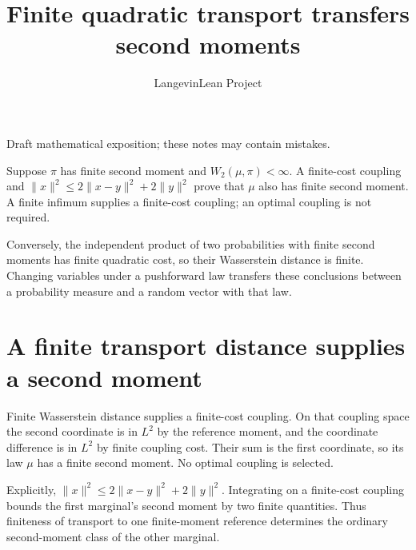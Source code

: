 \documentclass[11pt,a4paper]{article}
\title{\texorpdfstring{Finite quadratic transport transfers second moments}{Finite quadratic transport transfers second moments}}
\author{LangevinLean Project}
\date{}
\begin{document}
\maketitle
Draft mathematical exposition; these notes may contain mistakes.


Suppose \(\pi\) has finite second moment and \(W_2(\mu,\pi)<\infty\). A finite-cost coupling and \(\|x\|^2\le2\|x-y\|^2+2\|y\|^2\) prove that \(\mu\) also has finite second moment. A finite infimum supplies a finite-cost coupling; an optimal coupling is not required.



Conversely, the independent product of two probabilities with finite second moments has finite quadratic cost, so their Wasserstein distance is finite. Changing variables under a pushforward law transfers these conclusions between a probability measure and a random vector with that law.


\section{\texorpdfstring{A finite transport distance supplies a second moment}{A finite transport distance supplies a second moment}}


Finite Wasserstein distance supplies a finite-cost coupling. On that coupling space the second coordinate is in \(L^2\) by the reference moment, and the coordinate difference is in \(L^2\) by finite coupling cost. Their sum is the first coordinate, so its law \(\mu\) has a finite second moment. No optimal coupling is selected.



Explicitly, \(\|x\|^2\le2\|x-y\|^2+2\|y\|^2\). Integrating on a finite-cost coupling bounds the first marginal's second moment by two finite quantities. Thus finiteness of transport to one finite-moment reference determines the ordinary second-moment class of the other marginal.
\end{document}
